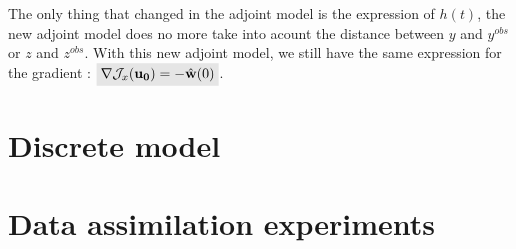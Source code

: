 \documentclass[11pt,a4paper]{article}
\renewcommand{\uz}{\mathbf{u_0}}
\renewcommand{\wh}{\hat{\mathbf{w}}}
\renewcommand{\J}{\mathcal{J}}
\renewcommand{\colbox}[1]{\colorbox{lightgray}{$ #1 $}}
\begin{document}
The only thing that changed in the adjoint model is the expression of $h(t)$, the new adjoint model does no more take into acount the distance between $y$ and $y^{obs}$ or $z$ and $z^{obs}$.
With this new adjoint model, we still have the same expression for the gradient : $\colbox{\nabla \J_x(\uz) = - \wh(0)}$.

\section{Discrete model}
\section{Data assimilation experiments}
\end{document}
